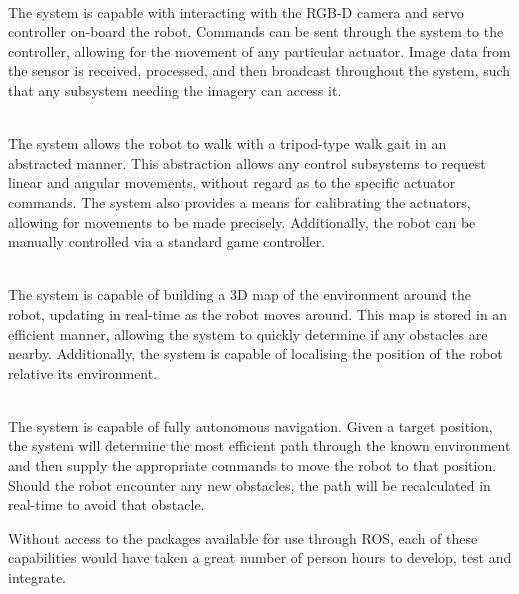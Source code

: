 \begin{description}[labelindent=\parindent]
	\item[Hardware Operations] \hfill \\
	The system is capable with interacting with the RGB-D camera and servo controller on-board the robot. Commands can be sent through the system to the controller, allowing for the movement of any particular actuator. Image data from the sensor is received, processed, and then broadcast throughout the system, such that any subsystem needing the imagery can access it.

	\item[Locomotion] \hfill \\
	The system allows the robot to walk with a tripod-type walk gait in an abstracted manner. This abstraction allows any control subsystems to request linear and angular movements, without regard as to the specific actuator commands. The system also provides a means for calibrating the actuators, allowing for movements to be made precisely. Additionally, the robot can be manually controlled via a standard game controller.

	\item[Sensing] \hfill \\
	The system is capable of building a 3D map of the environment around the robot, updating in real-time as the robot moves around. This map is stored in an efficient manner, allowing the system to quickly determine if any obstacles are nearby. Additionally, the system is capable of localising the position of the robot relative its environment.

	\item[Navigation] \hfill \\
	The system is capable of fully autonomous navigation. Given a target position, the system will determine the most efficient path through the known environment and then supply the appropriate commands to move the robot to that position. Should the robot encounter any new obstacles, the path will be recalculated in real-time to avoid that obstacle.

\end{description}

Without access to the packages available for use through ROS, each of these capabilities would have taken a great number of person hours to develop, test and integrate. 


